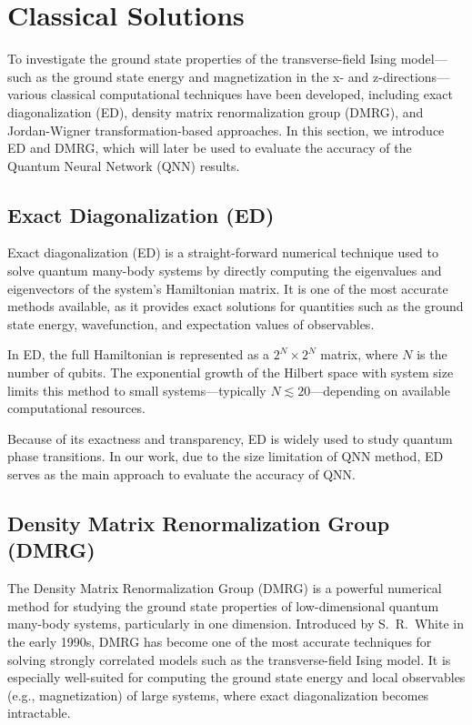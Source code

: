 \documentclass[pre,twocolumn,floatfix]{revtex4-1}
\begin{document}
\section{Classical Solutions}
To investigate the ground state properties of the transverse-field Ising model—such as the ground state energy and magnetization in the x- and z-directions—various classical computational techniques have been developed, including exact diagonalization (ED), density matrix renormalization group (DMRG), and Jordan-Wigner transformation-based approaches. In this section, we introduce ED and DMRG, which will later be used to evaluate the accuracy of the Quantum Neural Network (QNN) results. 
\subsection{Exact Diagonalization (ED)}
Exact diagonalization (ED) is a straight-forward numerical technique used to solve quantum many-body systems by directly computing the eigenvalues and eigenvectors of the system's Hamiltonian matrix. It is one of the most accurate methods available, as it provides exact solutions for quantities such as the ground state energy, wavefunction, and expectation values of observables.

In ED, the full Hamiltonian is represented as a $2^N \times 2^N$ matrix, where $N$ is the number of qubits. The exponential growth of the Hilbert space with system size limits this method to small systems---typically $N \lesssim 20$---depending on available computational resources.

Because of its exactness and transparency, ED is widely used to study quantum phase transitions. In our work, due to the size limitation of QNN method, ED serves as the main approach to evaluate the accuracy of QNN.


\subsection{Density Matrix Renormalization Group (DMRG)}
The Density Matrix Renormalization Group (DMRG) is a powerful numerical method for studying the ground state properties of low-dimensional quantum many-body systems, particularly in one dimension. Introduced by S.~R.~White in the early 1990s, DMRG has become one of the most accurate techniques for solving strongly correlated models such as the transverse-field Ising model. It is especially well-suited for computing the ground state energy and local observables (e.g., magnetization) of large systems, where exact diagonalization becomes intractable.\cite{simple-dmrg}
\end{document}

